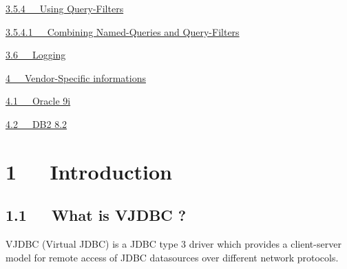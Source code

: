 \documentclass[10pt,a4paper,english]{article}
\begin{document}
\begin{list}{}{}
\begin{list}{}{}
\begin{list}{}{}
\item {} \href{\#using-query-filters}{3.5.4~~~Using Query-Filters}
\begin{list}{}{}
\item {} \href{\#combining-named-queries-and-query-filters}{3.5.4.1~~~Combining Named-Queries and Query-Filters}

\end{list}

\end{list}

\item {} \href{\#logging}{3.6~~~Logging}

\end{list}

\item {} \href{\#vendor-specific-informations}{4~~~Vendor-Specific informations}
\begin{list}{}{}
\item {} \href{\#oracle-9i}{4.1~~~Oracle 9i}

\item {} \href{\#db2-8-2}{4.2~~~DB2 8.2}

\end{list}

\end{list}




\hypertarget{introduction}{}
\section*{1~~~Introduction}



\hypertarget{what-is-vjdbc}{}
\subsection*{1.1~~~What is VJDBC ?}

VJDBC (Virtual JDBC) is a JDBC type 3 driver which provides a client-server model for remote access of JDBC datasources over different   network protocols.



\hypertarget{features}{}
\end{document}
